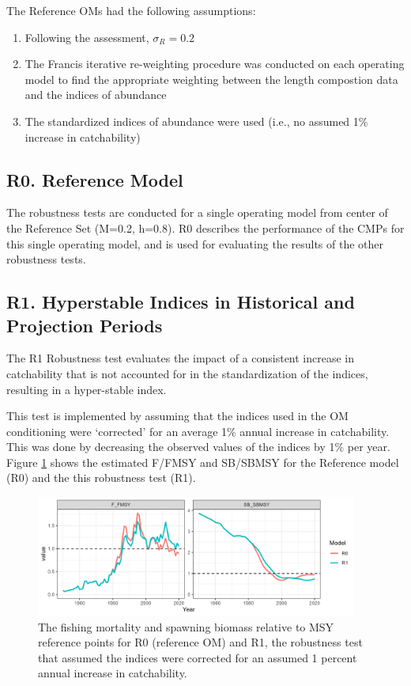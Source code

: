 \documentclass[
]{article}
\providecommand{\tightlist}{%
  \setlength{\itemsep}{0pt}\setlength{\parskip}{0pt}}
\begin{document}
The Reference OMs had the following assumptions:

\begin{enumerate}
\def\labelenumi{\arabic{enumi}.}
\tightlist
\item
  Following the assessment, \(\sigma_R = 0.2\)
\item
  The Francis iterative re-weighting procedure was conducted on each operating model to find the appropriate weighting between the length compostion data and the indices of abundance
\item
  The standardized indices of abundance were used (i.e., no assumed 1\% increase in catchability)
\end{enumerate}

\hypertarget{r0.-reference-model}{%
\subsection{R0. Reference Model}\label{r0.-reference-model}}

The robustness tests are conducted for a single operating model from center of the Reference Set (M=0.2, h=0.8). R0 describes the performance of the CMPs for this single operating model, and is used for evaluating the results of the other robustness tests.

\hypertarget{r1.-hyperstable-indices-in-historical-and-projection-periods}{%
\subsection{R1. Hyperstable Indices in Historical and Projection Periods}\label{r1.-hyperstable-indices-in-historical-and-projection-periods}}

The R1 Robustness test evaluates the impact of a consistent increase in catchability that is not accounted for in the standardization of the indices, resulting in a hyper-stable index.

This test is implemented by assuming that the indices used in the OM conditioning were `corrected' for an average 1\% annual increase in catchability. This was done by decreasing the observed values of the indices by 1\% per year. Figure \ref{fig:r1-compare} shows the estimated F/FMSY and SB/SBMSY for the Reference model (R0) and the this robustness test (R1).

\begin{figure}
\includegraphics[width=400px]{../../img/R1_Increasing_q/Compare} \caption{The fishing mortality and spawning biomass relative to MSY reference points for R0 (reference OM) and R1, the robustness test that assumed the indices were corrected for an assumed 1 percent annual increase in catchability.}\label{fig:r1-compare}
\end{figure}
\end{document}
